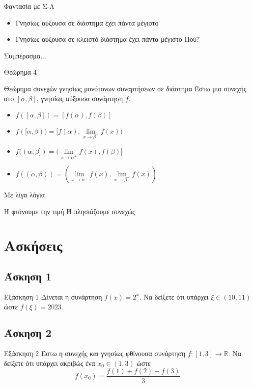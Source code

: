 \documentclass[greek]{beamer}
\begin{document}
\begin{frame}{Φαντασία με Σ-Λ}
 \begin{itemize}
  \item<1-> Γνησίως αύξουσα σε διάστημα έχει πάντα μέγιστο
  \item<2-> Γνησίως αύξουσα σε κλειστό διάστημα έχει πάντα μέγιστο  Πού?
 \end{itemize}
 Συμπέρασμα...
\end{frame}

\begin{frame}{Θεώρημα 4}
 \begin{block}{Θεώρημα συνεχών γνησίως μονότονων συναρτήσεων σε διάστημα}
  Έστω μια συνεχής στο $[α,β]$, γνησίως αύξουσα συνάρτηση $f$.
  \begin{itemize}
   \item<1-> $f([α,β])=[f(α),f(β)]$
   \item<2-> $f([α,β))=[f(α),\lim\limits_{x \to β^-}{ f(x) })$
   \item<3-> $f((α,β])=(\lim\limits_{x \to α^+}{ f(x) },f(β)]$
   \item<4-> $f((α,β))=(\lim\limits_{x \to α^+}{ f(x) },\lim\limits_{x \to β^-}{ f(x) })$
  \end{itemize}
 \end{block}
 Με λίγα λόγια

 Ή φτάνουμε την τιμή Ή πλησιάζουμε συνεχώς
\end{frame}

\section{Ασκήσεις}
\subsection{Άσκηση 1}
\begin{frame}[label=Άσκηση1]{Εξάσκηση 1}
 Δίνεται η συνάρτηση $f(x)=2^x$. Να δείξετε ότι υπάρχει $ξ\in (10,11)$ ώστε $f(ξ)=2023$.

 \hyperlink{Λύση1}{}
\end{frame}

\subsection{Άσκηση 2}
\begin{frame}[label=Άσκηση2]{Εξάσκηση 2}
 Έστω η συνεχής και γνησίως φθίνουσα συνάρτηση $f:[1,3]\to\mathbb{R}$. Να δείξετε ότι υπάρχει ακριβώς ένα $x_0\in (1,3)$ ώστε
 $$f(x_0)=\frac{f(1)+f(2)+f(3)}{3}$$

 \hyperlink{Λύση2}{}
\end{frame}
\end{document}
